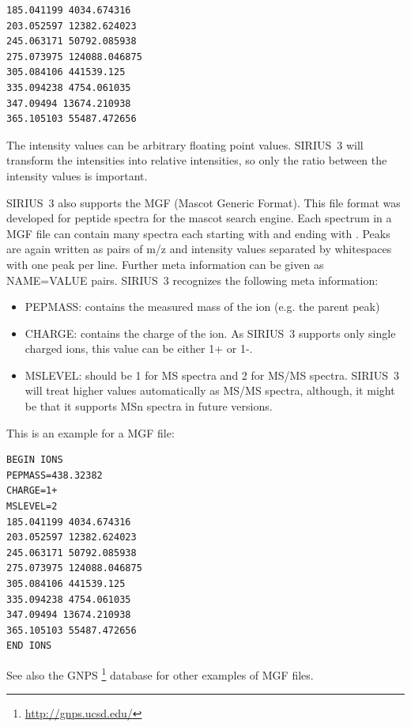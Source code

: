 \documentclass[letterpaper,10pt,openany,oneside]{sphinxmanual}
\begin{document}
\begin{Verbatim}[commandchars=\\\{\}]
185.041199 4034.674316
203.052597 12382.624023
245.063171 50792.085938
275.073975 124088.046875
305.084106 441539.125
335.094238 4754.061035
347.09494 13674.210938
365.105103 55487.472656
\end{Verbatim}

The intensity values can be arbitrary floating point values. SIRIUS~3 will transform the intensities into relative intensities, so only the ratio between the intensity values is important.

SIRIUS~3 also supports the MGF (Mascot Generic Format). This file format was developed for peptide spectra for the mascot search engine. Each spectrum in a MGF file can contain many spectra each starting with  and ending with . Peaks are again written as pairs of m/z and intensity values separated by whitespaces with one peak per line. Further meta information can be given as NAME=VALUE pairs. SIRIUS~3 recognizes the following meta information:
\begin{itemize}
\item {} 
PEPMASS: contains the measured mass of the ion (e.g. the parent peak)

\item {} 
CHARGE: contains the charge of the ion. As SIRIUS~3 supports only single charged ions, this value can be either 1+ or 1-.

\item {} 
MSLEVEL: should be 1 for MS spectra and 2 for MS/MS spectra. SIRIUS~3 will treat higher values automatically as MS/MS spectra, although, it might be that it supports MSn spectra in future versions.

\end{itemize}

This is an example for a MGF file:

\begin{Verbatim}[commandchars=\\\{\}]
BEGIN IONS
PEPMASS=438.32382
CHARGE=1+
MSLEVEL=2
185.041199 4034.674316
203.052597 12382.624023
245.063171 50792.085938
275.073975 124088.046875
305.084106 441539.125
335.094238 4754.061035
347.09494 13674.210938
365.105103 55487.472656
END IONS
\end{Verbatim}

See also the GNPS \footnote{\sphinxAtStartFootnote%
\url{http://gnps.ucsd.edu/}
} database for other examples of MGF files.
\end{document}
